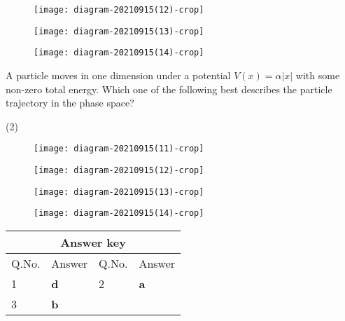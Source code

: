 \begin{enumerate}
\begin{tasks}
\begin{figure}[H]
	\end{figure}
	\task[\textbf{B.}]\begin{figure}[H]
		\centering
		\texttt{[image: diagram-20210915(12)-crop]}
	\end{figure}
	\task[\textbf{C.}]\begin{figure}[H]
		\centering
		\texttt{[image: diagram-20210915(13)-crop]}
	\end{figure}
	\task[\textbf{D.}]\begin{figure}[H]
		\centering
		\texttt{[image: diagram-20210915(14)-crop]}
	\end{figure}
\end{tasks}	
\begin{minipage}{\textwidth}
	\item A particle moves in one dimension under a potential $V(x)=\alpha|x|$ with some non-zero total energy. Which one of the following best describes the particle trajectory in the phase space?
\end{minipage}
\begin{tasks}(2)
	\task[\textbf{A.}]\begin{figure}[H]
		\centering
		\texttt{[image: diagram-20210915(11)-crop]}
		
	\end{figure}
	\task[\textbf{B.}]\begin{figure}[H]
		\centering
		\texttt{[image: diagram-20210915(12)-crop]}
	\end{figure}
	\task[\textbf{C.}]\begin{figure}[H]
		\centering
		\texttt{[image: diagram-20210915(13)-crop]}
	\end{figure}
	\task[\textbf{D.}]\begin{figure}[H]
		\centering
		\texttt{[image: diagram-20210915(14)-crop]}
	\end{figure}
\end{tasks}
\end{enumerate}
\setlength\arrayrulewidth{1pt}
\begin{table}[H]
	\centering
	
	\begin{tabular}{|p{1.5cm}|p{1.5cm}||p{1.5cm}|p{1.5cm}|}
		\hline
		\multicolumn{4}{|c|}{\textbf{Answer key}}\\\hline\hline
		\rowcolor{ocrel}Q.No.&Answer&Q.No.&Answer\\\hline
		1&\textbf{d}&2&\textbf{a}\\\hline
		3&\textbf{b}&&\\\hline
	\end{tabular}
\end{table}
